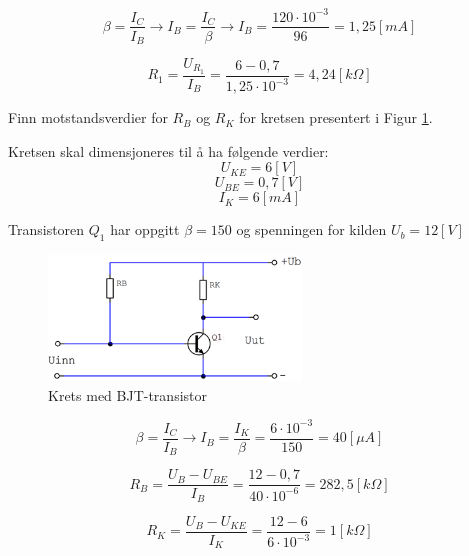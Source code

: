 \vspace{0.5cm} %

\begin{solution}[name=Løsningsforslag oppgave]
\[\beta = \frac{I_C}{I_B} \rightarrow I_B = \frac{I_C}{\beta} \rightarrow I_B= \frac{120 \cdot 10^{-3}}{96} = 1,25[mA]\]

\[R_1= \frac{U_{R_{1}}}{I_B} = \frac{6-0,7}{1,25 \cdot 10^{-3}}=4,24[k\Omega] \]

\end{solution}

\vspace{0.5cm} %

\begin{question}[name=Oppgave, topic=transBJT]

Finn motstandsverdier for $R_B$ og $R_K$ for kretsen presentert i Figur \ref{fig:tranBJT6}.

Kretsen skal dimensjoneres til å ha følgende verdier:
\[U_{KE}=6[V]\]
\[U_{BE}=0,7[V]\]
\[I_K=6[mA]\]

Transistoren $Q_1$ har oppgitt $ \beta= 150$ og spenningen for kilden $ U_b=12[V]$

	\begin{figure}[H]
		\centering
		\includegraphics[width=0.6\textwidth]{transistor-BJT/figurer/krets6.png}
		\caption{Krets med BJT-transistor}
		\label{fig:tranBJT6}
	\end{figure}

\end{question}

\vspace{0.5cm} %

\begin{solution}[name=Løsningsforslag oppgave]
\[\beta = \frac{I_C}{I_B} \rightarrow I_B=\frac{I_K}{\beta}=\frac{6 \cdot 10^{-3}}{150} = 40[\mu A]\]

\[R_B=\frac{U_B-U_{BE}}{I_B}= \frac{12-0,7}{40 \cdot 10^{-6}}=282,5[k\Omega] \]

\[R_K=\frac{U_B-U_{KE}}{I_K}= \frac{12-6}{6 \cdot 10^{-3}}=1[k\Omega]\]

\end{solution}



